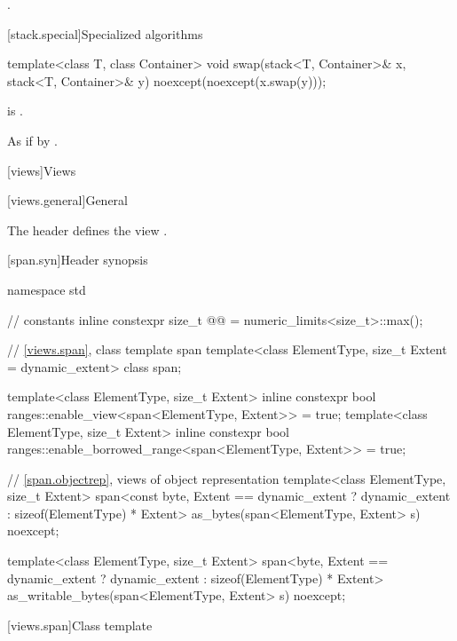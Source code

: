 \begin{itemdescr}
\pnum
\returns
{}.
\end{itemdescr}

[stack.special]{Specialized algorithms}

%
\begin{itemdecl}
template<class T, class Container>
  void swap(stack<T, Container>& x, stack<T, Container>& y) noexcept(noexcept(x.swap(y)));
\end{itemdecl}

\begin{itemdescr}
\pnum
\constraints
{} is .

\pnum
\effects
As if by .
\end{itemdescr}

[views]{Views}

[views.general]{General}

\pnum
The header  defines the view .

[span.syn]{Header  synopsis}%

%
\begin{codeblock}
namespace std {
  // constants
  inline constexpr size_t @@ = numeric_limits<size_t>::max();

  // \ref{views.span}, class template span
  template<class ElementType, size_t Extent = dynamic_extent>
    class span;

  template<class ElementType, size_t Extent>
    inline constexpr bool ranges::enable_view<span<ElementType, Extent>> = true;
  template<class ElementType, size_t Extent>
    inline constexpr bool ranges::enable_borrowed_range<span<ElementType, Extent>> = true;

  // \ref{span.objectrep}, views of object representation
  template<class ElementType, size_t Extent>
    span<const byte, Extent == dynamic_extent ? dynamic_extent : sizeof(ElementType) * Extent>
      as_bytes(span<ElementType, Extent> s) noexcept;

  template<class ElementType, size_t Extent>
    span<byte, Extent == dynamic_extent ? dynamic_extent : sizeof(ElementType) * Extent>
      as_writable_bytes(span<ElementType, Extent> s) noexcept;
}
\end{codeblock}

[views.span]{Class template }

